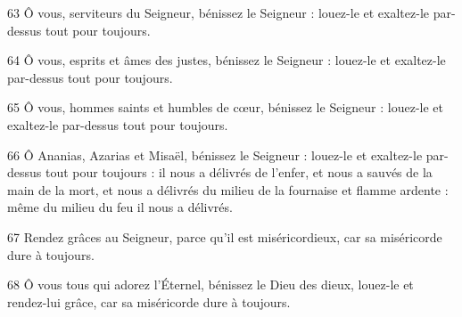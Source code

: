 \par 63 Ô vous, serviteurs du Seigneur, bénissez le Seigneur : louez-le et exaltez-le par-dessus tout pour toujours.
\par 64 Ô vous, esprits et âmes des justes, bénissez le Seigneur : louez-le et exaltez-le par-dessus tout pour toujours.
\par 65 Ô vous, hommes saints et humbles de cœur, bénissez le Seigneur : louez-le et exaltez-le par-dessus tout pour toujours.
\par 66 Ô Ananias, Azarias et Misaël, bénissez le Seigneur : louez-le et exaltez-le par-dessus tout pour toujours : il nous a délivrés de l'enfer, et nous a sauvés de la main de la mort, et nous a délivrés du milieu de la fournaise et flamme ardente : même du milieu du feu il nous a délivrés.
\par 67 Rendez grâces au Seigneur, parce qu'il est miséricordieux, car sa miséricorde dure à toujours.
\par 68 Ô vous tous qui adorez l'Éternel, bénissez le Dieu des dieux, louez-le et rendez-lui grâce, car sa miséricorde dure à toujours.

